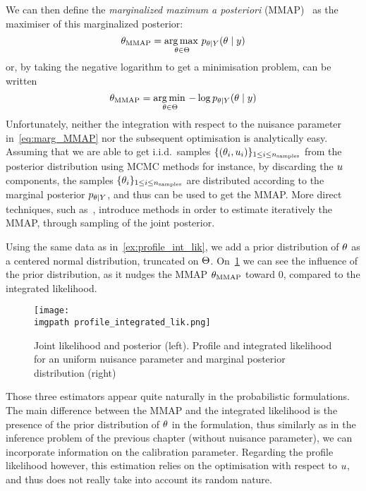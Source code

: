\documentclass[../../Main_ManuscritThese.tex]{subfiles}
\newcommand\imgpath{/home/victor/acadwriting/Manuscrit/Text/Chapter3/img/}
\begin{document}
We can then define the \emph{marginalized maximum a posteriori} (MMAP)~\cite{doucet_marginal_2002} as the  maximiser of this marginalized posterior:
\begin{equation}
  \label{eq:def_MMAP}
  {\theta}_{\mathrm{MMAP}} = \operatorname*{arg\,max \,}_{\theta\in\Theta} p_{\theta \mid Y}(\theta\mid y)
\end{equation}
or, by taking the negative logarithm to get a minimisation problem, can be written
\begin{equation}
{\theta}_{\mathrm{MMAP}} = \operatorname*{arg\,min \,}_{\theta\in\Theta} -\log  p_{\theta\mid Y}(\theta\mid y)
\end{equation}
Unfortunately, neither the integration with respect to the nuisance parameter in~\eqref{eq:marg_MMAP} nor the subsequent optimisation is analytically easy.
Assuming that we are able to get i.i.d.\ samples $\{(\theta_i, u_i)\}_{1\leq i \leq n_{\mathrm{samples}}}$ from the posterior distribution using MCMC methods for instance, by discarding the $u$ components, the samples $\{\theta_i\}_{1 \leq i\leq n_{\mathrm{samples}}}$ are distributed according to the marginal posterior $p_{\theta \mid Y}$, and thus can be used to get the MMAP. More direct techniques, such as~\cite{doucet_marginal_2002}, introduce methods in order to estimate iteratively the MMAP, through sampling of the joint posterior.
\begin{example}
  Using the same data as in~\cref{ex:profile_int_lik}, we add a prior distribution of $\theta$ as a centered normal distribution, truncated on $\Theta$. On~\cref{fig:profile_integrated_lik} we can see the influence of the prior distribution, as it nudges the MMAP ${\theta}_{\mathrm{MMAP}}$ toward $0$, compared to the integrated likelihood.
\end{example}
\begin{figure}[ht]
  \centering
  \texttt{[image: \\imgpath profile\_integrated\_lik.png]}
  \caption[Joint likelihood and posterior distribution]{\label{fig:profile_integrated_lik} Joint likelihood and posterior (left). Profile and integrated likelihood for an uniform nuisance parameter and marginal posterior distribution (right)}
\end{figure}
Those three estimators appear quite naturally in the probabilistic
formulations. The main difference between the MMAP and the integrated
likelihood is the presence of the prior distribution of $\theta$ in the
formulation, thus similarly as in the inference problem of the
previous chapter (without nuisance parameter), we can incorporate
information on the calibration parameter. Regarding the profile
likelihood however, this estimation relies on the optimisation with
respect to $u$, and thus does not really take into account its
random nature.
\end{document}
